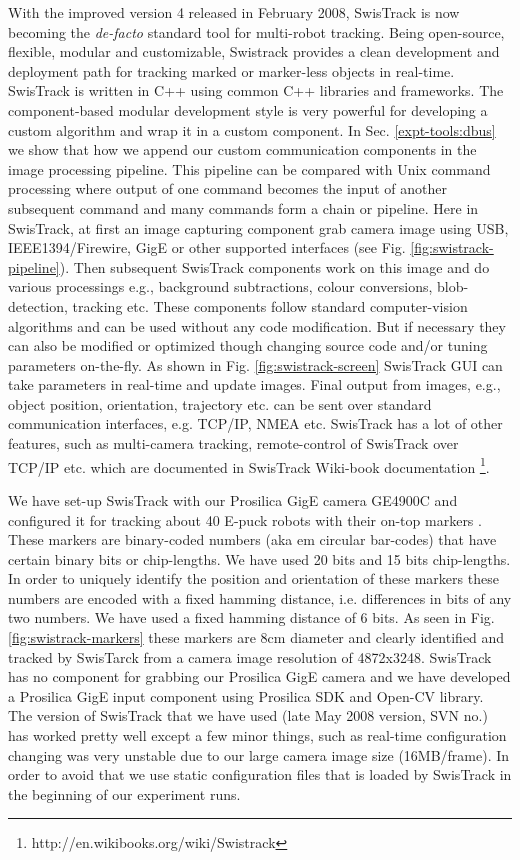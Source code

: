 With the improved version 4 released in February 2008, SwisTrack is now becoming the {\em de-facto} standard tool for multi-robot tracking. Being open-source, flexible, modular and customizable, Swistrack provides a clean development and deployment path for tracking marked or marker-less objects in real-time.  SwisTrack is written in C++ using common C++ libraries and frameworks. The component-based modular development style is very powerful for developing a custom algorithm and wrap it in a custom component. In Sec. \ref{expt-tools:dbus} we show that how we append our custom communication components in the image  processing pipeline.  This pipeline can be compared with Unix command processing where output of one command becomes the input of another subsequent command and many commands form a chain or pipeline. Here in SwisTrack, at first an image capturing component grab camera image using USB, IEEE1394/Firewire, GigE or other supported interfaces (see Fig. \ref{fig:swistrack-pipeline}).  Then subsequent SwisTrack components work on this image and do various processings e.g., background subtractions, colour conversions, blob-detection, tracking etc. These components follow standard computer-vision algorithms and can be used without any code modification. But if necessary they can also be modified or optimized though changing source code and/or tuning parameters on-the-fly. As shown in Fig. \ref{fig:swistrack-screen} SwisTrack GUI can take parameters in real-time and update images. Final output from images, e.g., object position, orientation, trajectory etc. can be sent over standard communication interfaces, e.g. TCP/IP, NMEA   etc. SwisTrack has a lot of other features, such as multi-camera tracking, remote-control of SwisTrack over TCP/IP etc. which are documented in SwisTrack Wiki-book documentation \footnote{http://en.wikibooks.org/wiki/Swistrack}.

We have set-up SwisTrack with our Prosilica GigE camera GE4900C and configured it for tracking about 40 E-puck robots with their on-top markers . These markers are binary-coded numbers (aka {em circular bar-codes}) that have certain binary bits or chip-lengths. We have used 20 bits and 15 bits chip-lengths. In order to uniquely identify the position and orientation of  these markers these numbers are encoded with a fixed hamming distance, i.e. differences in bits of any two numbers. We have used a fixed hamming distance of 6 bits. As seen in Fig. \ref{fig:swistrack-markers} these markers are 8cm diameter and clearly identified and tracked by SwisTarck from a camera image resolution of 4872x3248. SwisTrack has no component for grabbing our Prosilica GigE camera and we have developed  a Prosilica GigE  input component using Prosilica SDK and Open-CV library. The version of SwisTrack that we have used (late May 2008 version, SVN no.) has worked pretty well except a few minor things, such as real-time configuration changing was very unstable due to our large camera image size (16MB/frame).  In order to avoid that we use static configuration files that is loaded by SwisTrack in the beginning of our experiment runs.


